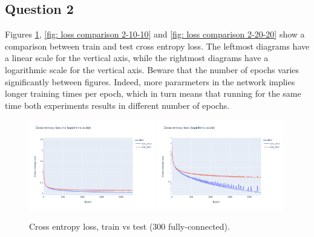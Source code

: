 \documentclass[12pt]{article}
\begin{document}
\subsection{Question 2}
Figures \ref{fig: loss comparison 1-300}, \ref{fig: loss comparison 2-10-10} and \ref{fig: loss comparison 2-20-20} show a comparison between train and test cross entropy loss.
The leftmost diagrams have a linear scale for the vertical axis, while the rightmost diagrams have a logarithmic scale for the vertical axis.
Beware that the number of epochs varies significantly between figures.
Indeed, more pararmeters in the network implies longer training times per epoch, which in turn means that running for the same time both experiments results in different number of epochs. \\
\begin{figure}[ht]
    \centering
    \includegraphics[width=0.49\textwidth]{images/cross-entropy-comparison-1-300.png}
    \includegraphics[width=0.49\textwidth]{images/cross-entropy-comparison-1-300-log.png}
    \caption{Cross entropy loss, train vs test ($300$ fully-connected).}
    \label{fig: loss comparison 1-300}
\end{figure}
\end{document}
